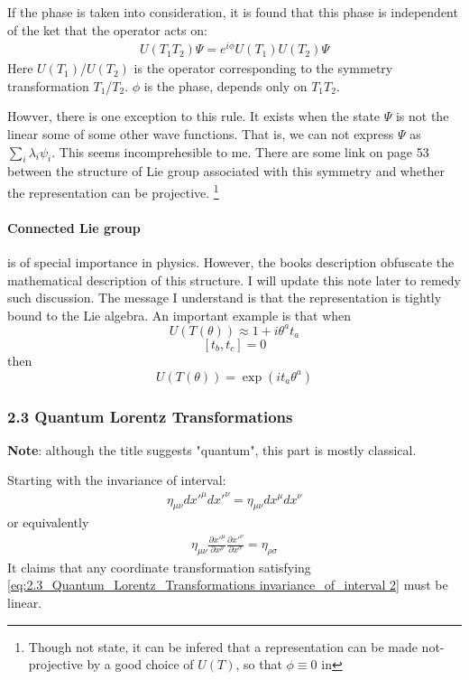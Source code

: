 If the phase is taken into consideration, it is found that this
phase is independent of the ket that the operator acts on:
\begin{align}
    \label{eq:2.2_symmetries_projective_phase}
    U(T_1 T_2) \Psi = e^{i\phi} U(T_1) U(T_2) \Psi
\end{align}
Here $U(T_1)$/$U(T_2)$ is the operator corresponding to the symmetry
transformation $T_1$/$T_2$. $\phi$ is the phase, depends only
on $T_1 T_2$.

Howver, there is one exception to this rule. It exists when the
state $\Psi$ is not the linear some of some other wave functions.
That is, we can not express $\Psi$ as $\sum_i \lambda_i \psi_i$.
This seems incomprehesible to me.
There are some link on page 53
between the structure of Lie group associated
with this symmetry and whether the representation can be projective.
\footnote{Though not state, it can be infered that a representation
can be made not-projective by a good choice of $U(T)$, so that
$\phi \equiv 0$ in  }

\paragraph{Connected Lie group} is of special importance in physics.
However, the books description obfuscate the mathematical description
of this structure. I will update this note later to remedy such
discussion. The message I understand is that the representation is
tightly bound to the Lie algebra. An important example is that when
$$ U(T(\theta)) \approx 1 + i \theta^a t_a $$
$$ [t_b,t_c] = 0$$
then
$$ U(T(\theta)) = \exp(it_a \theta^a) $$

\subsubsection{2.3 Quantum Lorentz Transformations}
\label{sec:2.3_Quantum_Lorentz_Transformations}
\textbf{Note}: although the title suggests "quantum", this part is
mostly classical.

Starting with the invariance of interval:
\begin{align}
    \label{eq:2.3_Quantum_Lorentz_Transformations invariance_of_interval}
    \eta_{\mu\nu}dx'^\mu dx'^\nu = \eta_{\mu\nu}dx^\mu dx^\nu
\end{align}
or equivalently %
\begin{align}
    \label{eq:2.3_Quantum_Lorentz_Transformations invariance_of_interval 2}
    \eta_{\mu\nu} \frac{\partial x'^\mu}{\partial x^\rho}
        \frac{\partial x'^\nu}{\partial x^\sigma}
        =
    \eta_{\rho\sigma}
\end{align}
It claims that any coordinate transformation satisfying 
\ref{eq:2.3_Quantum_Lorentz_Transformations invariance_of_interval 2}
must be linear.

